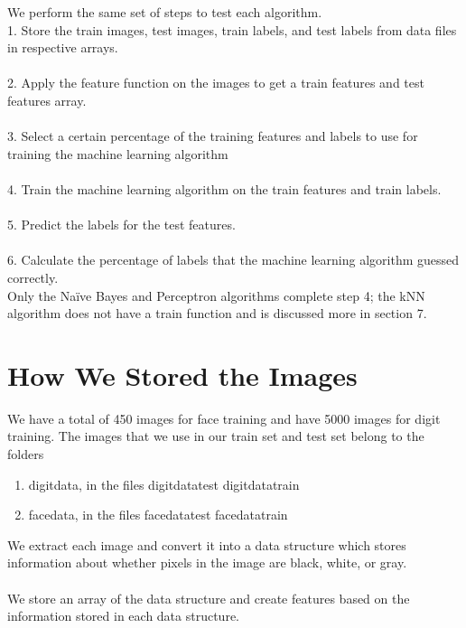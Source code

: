 \documentclass{article}
\begin{document}
We perform the same set of steps to test each algorithm. \\

1. Store the train images, test images, train labels, and test labels from data files in respective arrays. \\\\
2. Apply the feature function on the images to get a train features and test features array. \\\\
3. Select a certain percentage of the training features and labels to use for training the machine learning algorithm\\\\
4. Train the machine learning algorithm on the train features and train labels. \\\\
5. Predict the labels for the test features. \\\\
6. Calculate the percentage of labels that the machine learning algorithm guessed correctly. \\


Only the Naïve Bayes and Perceptron algorithms complete step 4; the kNN algorithm does not have a train function and is discussed more in section 7. 


\section{How We Stored the Images}

We have a total of 450 images for face training and have 5000 images for digit training. The images that we use in our train set and test set belong to the folders 

\begin{enumerate}
	\item digitdata, in the files
		\subitem digitdatatest
		\subitem digitdatatrain
	\item facedata, in the files
		\subitem facedatatest
		\subitem facedatatrain
\end{enumerate}

We extract each image and convert it into a data structure which stores information about whether pixels in the image are black, white, or gray. \\\\
We store an array of the data structure and create features based on the information stored in each data structure.
\end{document}
